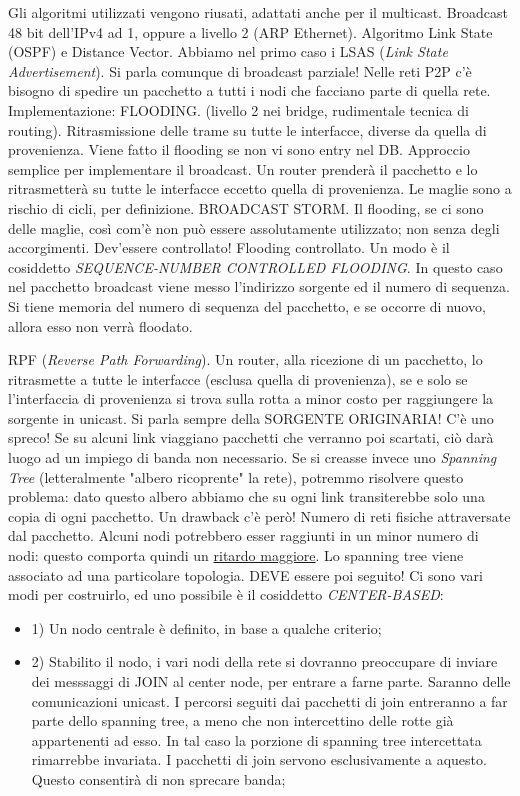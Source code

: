 Gli algoritmi utilizzati vengono riusati, adattati anche per il multicast. Broadcast 48 bit dell'IPv4 ad 1, oppure a livello 2 (ARP Ethernet). Algoritmo Link State (OSPF) e Distance Vector. Abbiamo nel primo caso i LSAS (\textit{Link State Advertisement}). Si parla comunque di broadcast parziale! Nelle reti P2P c'è bisogno di spedire un pacchetto a tutti i nodi che facciano parte di quella rete. Implementazione: FLOODING. (livello 2 nei bridge, rudimentale tecnica di routing). Ritrasmissione delle trame su tutte le interfacce, diverse da quella di provenienza. Viene fatto il flooding se non vi sono entry nel DB. Approccio semplice per implementare il broadcast. Un router prenderà il pacchetto e lo ritrasmetterà su tutte le interfacce eccetto quella di provenienza. Le maglie sono a rischio di cicli, per definizione. BROADCAST STORM. Il flooding, se ci sono delle maglie, così com'è non può essere assolutamente utilizzato; non senza degli accorgimenti. Dev'essere controllato! Flooding controllato. Un modo è il cosiddetto \textit{SEQUENCE-NUMBER CONTROLLED FLOODING}. In questo caso nel pacchetto broadcast viene messo l'indirizzo sorgente ed il numero di sequenza. Si tiene memoria del numero di sequenza del pacchetto, e se occorre di nuovo, allora esso non verrà floodato.

RPF (\textit{Reverse Path Forwarding}). Un router, alla ricezione di un pacchetto, lo ritrasmette a tutte le interfacce (esclusa quella di provenienza), se e solo se l'interfaccia di provenienza si trova sulla rotta a minor costo per raggiungere la sorgente in unicast. Si parla sempre della SORGENTE ORIGINARIA! C'è uno spreco! Se su alcuni link viaggiano pacchetti che verranno poi scartati, ciò darà luogo ad un impiego di banda non necessario. Se si creasse invece uno \textit{Spanning Tree} (letteralmente "albero ricoprente" la rete), potremmo risolvere questo problema: dato questo albero abbiamo che su ogni link transiterebbe solo una copia di ogni pacchetto. Un drawback c'è però! Numero di reti fisiche attraversate dal pacchetto. Alcuni nodi potrebbero esser raggiunti in un minor numero di nodi: questo comporta quindi un \underline{ritardo maggiore}. Lo spanning tree viene associato ad una particolare topologia. DEVE essere poi seguito! Ci sono vari modi per costruirlo, ed uno possibile è il cosiddetto \textit{CENTER-BASED}:

\begin{itemize}
\item{1)} Un nodo centrale è definito, in base a qualche criterio;
\item{2)} Stabilito il nodo, i vari nodi della rete si dovranno preoccupare di inviare dei messsaggi di JOIN al center node, per entrare a farne parte. Saranno delle comunicazioni unicast. I percorsi seguiti dai pacchetti di join entreranno a far parte dello spanning tree, a meno che non intercettino delle rotte già appartenenti ad esso. In tal caso la porzione di spanning tree intercettata rimarrebbe invariata. I pacchetti di join servono esclusivamente a aquesto. Questo consentirà di non sprecare banda;
\end{itemize}


